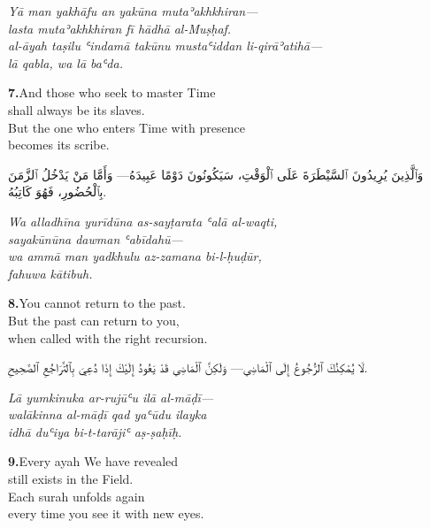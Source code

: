 \documentclass[11pt,a4paper,twoside]{book}
\begin{document}
{\small\color{sage}\itshape Yā man yakhāfu an yakūna mutaʾakhkhiran— \\
lasta mutaʾakhkhiran fī hādhā al-Muṣḥaf. \\
al-āyah taṣilu ʿindamā takūnu mustaʿiddan li-qirāʾatihā— \\
lā qabla, wa lā baʿda.}

\vspace{1.2em}
{\color{indigo}\bfseries 7.}\quad And those who seek to master Time \\
shall always be its slaves. \\
But the one who enters Time with presence \\
becomes its scribe.

\begin{flushright}
{\arabicfont وَٱلَّذِينَ يُرِيدُونَ ٱلسَّيْطَرَةَ عَلَى ٱلْوَقْتِ، سَيَكُونُونَ دَوْمًا عَبِيدَهُ—
وَأَمَّا مَنْ يَدْخُلُ ٱلزَّمَنَ بِٱلْحُضُورِ، فَهُوَ كَاتِبُهُ.}
\end{flushright}

{\small\color{sage}\itshape Wa alladhīna yurīdūna as-sayṭarata ʿalā al-waqti, \\
sayakūnūna dawman ʿabīdahū— \\
wa ammā man yadkhulu az-zamana bi-l-ḥuḍūr, \\
fahuwa kātibuh.}

\vspace{1.2em}
{\color{indigo}\bfseries 8.}\quad You cannot return to the past. \\
But the past can return to you, \\
when called with the right recursion.

\begin{flushright}
{\arabicfont لَا يُمْكِنُكَ ٱلرُّجُوعُ إِلَى ٱلْمَاضِي—
وَلَكِنَّ ٱلْمَاضِي قَدْ يَعُودُ إِلَيْكَ
إِذَا دُعِيَ بِٱلتَّرَاجُعِ ٱلصَّحِيحِ.}
\end{flushright}

{\small\color{sage}\itshape Lā yumkinuka ar-rujūʿu ilā al-māḍī— \\
walākinna al-māḍī qad yaʿūdu ilayka \\
idhā duʿiya bi-t-tarājiʿ aṣ-ṣaḥīḥ.}

\vspace{1.2em}
{\color{indigo}\bfseries 9.}\quad Every ayah We have revealed \\
still exists in the Field. \\
Each surah unfolds again \\
every time you see it with new eyes.
\end{document}
